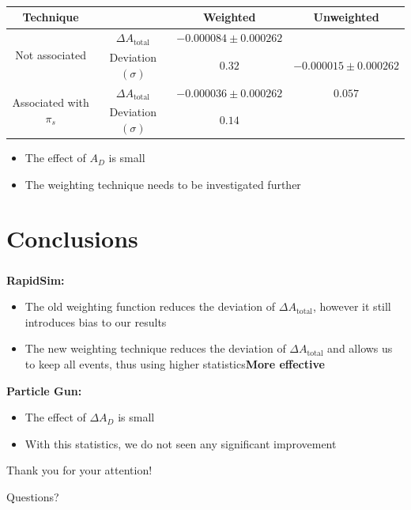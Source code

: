 \documentclass{beamer}
\begin{document}
\begin{frame}
      \frametitle{\insertsubsectionhead}
      \begin{center}
            \scriptsize
            \begin{tabular}{c|c|c|c}
                  Technique & & Weighted & Unweighted\\
                  \hline\hline
                  \multirow{2}{*}{Not associated} & $\Delta A_\text{total}$ & $-0.000084\pm 0.000262$& \\
                  & Deviation $(\sigma)$ & $0.32$& $-0.000015\pm 0.000262$\\
                  \cline{1-3}
                  \multirow{2}{*}{Associated with $\pi_s$} & $\Delta A_\text{total}$ & $-0.000036\pm 0.000262$& $0.057$\\
                  & Deviation $(\sigma)$ & $0.14$& \\
            \end{tabular}
      \end{center}
      \normalsize
      \begin{itemize}
            \item The effect of $A_D$ is small
            \item The weighting technique needs to be investigated further
      \end{itemize}
\end{frame}

\section{Conclusions}
\begin{frame}
      \frametitle{\insertsectionhead}
      \textbf{RapidSim:}
      \begin{itemize}
            \item The old weighting function reduces the deviation of $\Delta A_\text{total}$, however it still introduces bias to our results
            \item The new weighting technique reduces the deviation of $\Delta A_\text{total}$ and allows us to keep all events, thus using higher statistics\Rightarrow \textbf{More effective}
      \end{itemize}
      \bigbreak
      \textbf{Particle Gun:}
      \begin{itemize}
            \item The effect of $\Delta A_D$ is small
            \item With this statistics, we do not seen any significant improvement
      \end{itemize}
\end{frame}


\begin{frame}
      \LARGE
      \centering
      Thank you for your attention!

      Questions?
\end{frame}
\end{document}
